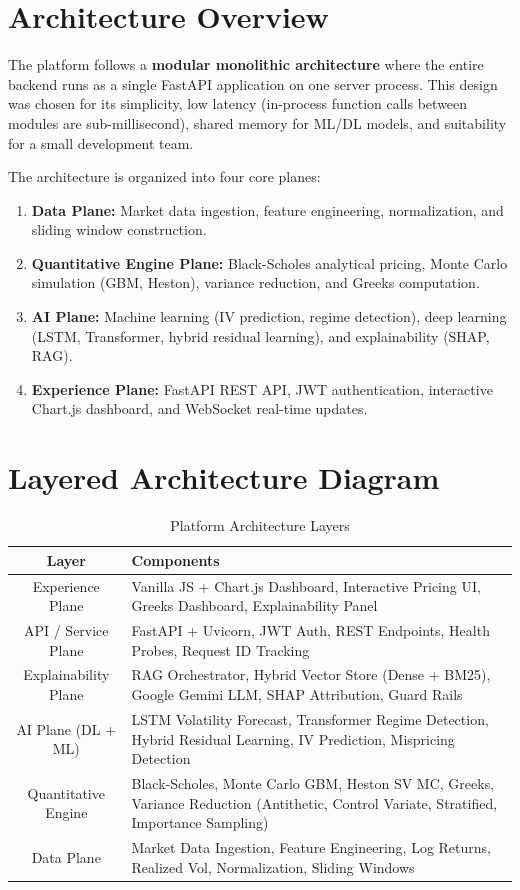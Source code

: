\documentclass[12pt,a4paper]{report}
\begin{document}
\section{Architecture Overview}

The platform follows a \textbf{modular monolithic architecture} where the entire backend runs as a single FastAPI application on one server process. This design was chosen for its simplicity, low latency (in-process function calls between modules are sub-millisecond), shared memory for ML/DL models, and suitability for a small development team.

The architecture is organized into four core planes:

\begin{enumerate}
    \item \textbf{Data Plane:} Market data ingestion, feature engineering, normalization, and sliding window construction.
    \item \textbf{Quantitative Engine Plane:} Black-Scholes analytical pricing, Monte Carlo simulation (GBM, Heston), variance reduction, and Greeks computation.
    \item \textbf{AI Plane:} Machine learning (IV prediction, regime detection), deep learning (LSTM, Transformer, hybrid residual learning), and explainability (SHAP, RAG).
    \item \textbf{Experience Plane:} FastAPI REST API, JWT authentication, interactive Chart.js dashboard, and WebSocket real-time updates.
\end{enumerate}

\section{Layered Architecture Diagram}

\begin{table}[H]
\centering
\caption{Platform Architecture Layers}
\label{tab:arch-layers}
\begin{tabularx}{\textwidth}{|c|X|}
\hline
\textbf{Layer} & \textbf{Components} \\
\hline
Experience Plane & Vanilla JS + Chart.js Dashboard, Interactive Pricing UI, Greeks Dashboard, Explainability Panel \\
\hline
API / Service Plane & FastAPI + Uvicorn, JWT Auth, REST Endpoints, Health Probes, Request ID Tracking \\
\hline
Explainability Plane & RAG Orchestrator, Hybrid Vector Store (Dense + BM25), Google Gemini LLM, SHAP Attribution, Guard Rails \\
\hline
AI Plane (DL + ML) & LSTM Volatility Forecast, Transformer Regime Detection, Hybrid Residual Learning, IV Prediction, Mispricing Detection \\
\hline
Quantitative Engine & Black-Scholes, Monte Carlo GBM, Heston SV MC, Greeks, Variance Reduction (Antithetic, Control Variate, Stratified, Importance Sampling) \\
\hline
Data Plane & Market Data Ingestion, Feature Engineering, Log Returns, Realized Vol, Normalization, Sliding Windows \\
\hline
\end{tabularx}
\end{table}
\end{document}
